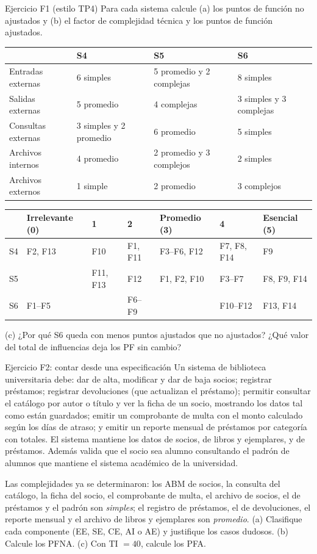 \documentclass[11pt,a4paper]{article}
\begin{document}
\begin{enunciado}{Ejercicio F1 (estilo TP4)}
Para cada sistema calcule (a) los puntos de función no ajustados y (b) el factor de complejidad técnica y los
puntos de función ajustados.
\begin{center}\small
\begin{tabular}{@{}l l l l@{}}
\toprule
 & S4 & S5 & S6\\
\midrule
Entradas externas & 6 simples & 5 promedio y 2 complejas & 8 simples\\
Salidas externas & 5 promedio & 4 complejas & 3 simples y 3 complejas\\
Consultas externas & 3 simples y 2 promedio & 6 promedio & 5 simples\\
Archivos internos & 4 promedio & 2 promedio y 3 complejos & 2 simples\\
Archivos externos & 1 simple & 2 promedio & 3 complejos\\
\bottomrule
\end{tabular}

\smallskip
\begin{tabular}{@{}lllllll@{}}
\toprule
 & Irrelevante (0) & 1 & 2 & Promedio (3) & 4 & Esencial (5)\\
\midrule
S4 & F2, F13 & F10 & F1, F11 & F3--F6, F12 & F7, F8, F14 & F9\\
S5 & & F11, F13 & F12 & F1, F2, F10 & F3--F7 & F8, F9, F14\\
S6 & F1--F5 & & F6--F9 & & F10--F12 & F13, F14\\
\bottomrule
\end{tabular}
\end{center}
(c) ¿Por qué S6 queda con menos puntos ajustados que no ajustados? ¿Qué valor del total de influencias deja los
PF sin cambio?
\end{enunciado}
\begin{enunciado}{Ejercicio F2: contar desde una especificación}
Un sistema de biblioteca universitaria debe: dar de alta, modificar y dar de baja socios; registrar préstamos;
registrar devoluciones (que actualizan el préstamo); permitir consultar el catálogo por autor o título y ver la
ficha de un socio, mostrando los datos tal como están guardados; emitir un comprobante de multa con el monto
calculado según los días de atraso; y emitir un reporte mensual de préstamos por categoría con totales. El
sistema mantiene los datos de socios, de libros y ejemplares, y de préstamos. Además valida que el socio sea
alumno consultando el padrón de alumnos que mantiene el sistema académico de la universidad.

Las complejidades ya se determinaron: los ABM de socios, la consulta del catálogo, la ficha del socio, el
comprobante de multa, el archivo de socios, el de préstamos y el padrón son \emph{simples}; el registro de
préstamos, el de devoluciones, el reporte mensual y el archivo de libros y ejemplares son \emph{promedio}.
(a) Clasifique cada componente (EE, SE, CE, AI o AE) y justifique los casos dudosos. (b) Calcule los PFNA. (c) Con
TI $= 40$, calcule los PFA.
\end{enunciado}
\end{document}

